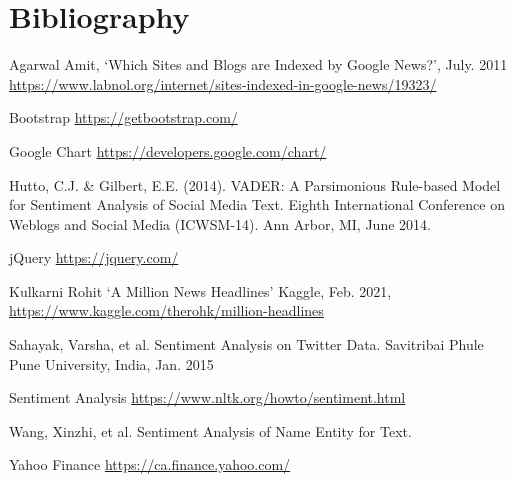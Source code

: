 \documentclass[12pt]{article}
\begin{document}
\clearpage
\section{Bibliography}
\begin{thebibliography}{10}

 Agarwal Amit, `Which Sites and Blogs are Indexed by Google News?', July. 2011 \url{https://www.labnol.org/internet/sites-indexed-in-google-news/19323/}

 Bootstrap \url{https://getbootstrap.com/}

 Google Chart \url{https://developers.google.com/chart/}

 Hutto, C.J. \& Gilbert, E.E. (2014). VADER: A Parsimonious Rule-based Model for Sentiment Analysis of Social Media Text. Eighth International Conference on Weblogs and Social Media (ICWSM-14). Ann Arbor, MI, June 2014.

 jQuery \url{https://jquery.com/}

 Kulkarni Rohit `A Million News Headlines' Kaggle, Feb. 2021, \url{https://www.kaggle.com/therohk/million-headlines}

 Sahayak, Varsha, et al. Sentiment Analysis on Twitter Data. Savitribai Phule Pune University, India, Jan. 2015

 Sentiment Analysis \url{https://www.nltk.org/howto/sentiment.html}

 Wang, Xinzhi, et al. Sentiment Analysis of Name Entity for Text.

 Yahoo Finance \url{https://ca.finance.yahoo.com/}

\end{thebibliography}
\end{document}
